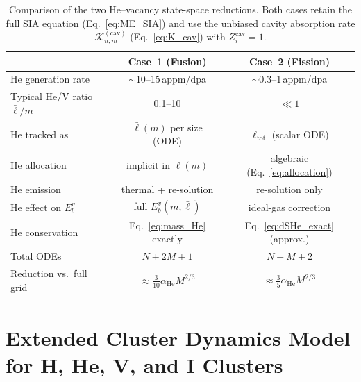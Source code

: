 \begin{table}[htbp]
\centering
\caption{Comparison of the two He--vacancy state-space reductions.
Both cases retain the full SIA equation (Eq.~\ref{eq:ME_SIA}) and use
the unbiased cavity absorption rate $\mathcal{K}_{n,m}^{(\mathrm{cav})}$
(Eq.~\ref{eq:K_cav}) with $Z_i^{\mathrm{cav}}=1$.}
\label{tab:HeV_comparison}
\renewcommand{\arraystretch}{1.2}
\begin{tabular}{@{}lcc@{}}
\toprule
& \textbf{Case~1 (Fusion)} & \textbf{Case~2 (Fission)} \\
\midrule
He generation rate & $\sim$10--15\,appm/dpa & $\sim$0.3--1\,appm/dpa \\
Typical He/V ratio $\bar{\ell}/m$ & 0.1--10 & $\ll 1$ \\
He tracked as & $\bar{\ell}(m)$ per size (ODE) & $\ell_{\mathrm{tot}}$ (scalar ODE) \\
He allocation & implicit in $\bar{\ell}(m)$ & algebraic (Eq.~\ref{eq:allocation}) \\
He emission & thermal + re-solution & re-solution only \\
He effect on $E_b^v$ & full $E_b^v(m,\bar{\ell})$ & ideal-gas correction \\
He conservation & Eq.~\ref{eq:mass_He} exactly & Eq.~\ref{eq:dSHe_exact} (approx.) \\
Total ODEs & $N + 2M + 1$ & $N + M + 2$ \\
Reduction vs.\ full grid & $\approx \tfrac{3}{10}\alpha_{\mathrm{He}} M^{2/3}$ & $\approx \tfrac{3}{5}\alpha_{\mathrm{He}} M^{2/3}$ \\
\bottomrule
\end{tabular}
\end{table}

\section{Extended Cluster Dynamics Model for H, He, V, and I Clusters}
\label{sec:H_extended}

